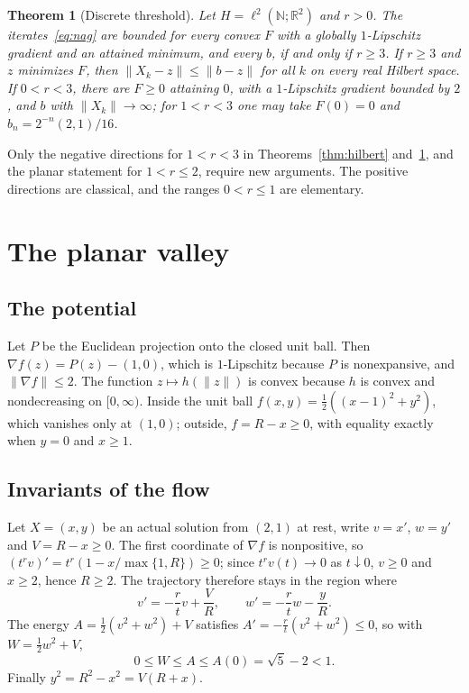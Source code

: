 \documentclass[11pt]{article}
\numberwithin{equation}{section}
\newtheorem{theorem}{Theorem}[section]
\theoremstyle{definition}
\theoremstyle{remark}
\newcommand{\R}{\mathbb R}
\newcommand{\N}{\mathbb N}
\newcommand{\norm}[1]{\lVert #1\rVert}
\begin{document}
\begin{theorem}[Discrete threshold]\label{thm:discrete}
Let $H=\ell^2(\N;\R^2)$ and $r>0$. The iterates~\eqref{eq:nag} are bounded for every convex $F$ with a globally $1$-Lipschitz gradient and an attained minimum, and every $b$, if and only if $r\ge3$. If $r\ge3$ and $z$ minimizes $F$, then $\norm{X_k-z}\le\norm{b-z}$ for all $k$ on every real Hilbert space. If $0<r<3$, there are $F\ge0$ attaining $0$, with a $1$-Lipschitz gradient bounded by $2$, and $b$ with $\norm{X_k}\to\infty$; for $1<r<3$ one may take $F(0)=0$ and $b_n=2^{-n}(2,1)/16$.
\end{theorem}

Only the negative directions for $1<r<3$ in Theorems~\ref{thm:hilbert} and~\ref{thm:discrete}, and the planar statement for $1<r\le2$, require new arguments. The positive directions are classical, and the ranges $0<r\le1$ are elementary.

\section{The planar valley}\label{sec:planar}
\subsection{The potential}
Let $P$ be the Euclidean projection onto the closed unit ball. Then $\nabla f(z)=P(z)-(1,0)$, which is $1$-Lipschitz because $P$ is nonexpansive, and $\norm{\nabla f}\le2$. The function $z\mapsto h(\norm z)$ is convex because $h$ is convex and nondecreasing on $[0,\infty)$. Inside the unit ball $f(x,y)=\frac12((x-1)^2+y^2)$, which vanishes only at $(1,0)$; outside, $f=R-x\ge0$, with equality exactly when $y=0$ and $x\ge1$.

\subsection{Invariants of the flow}
Let $X=(x,y)$ be an actual solution from $(2,1)$ at rest, write $v=x'$, $w=y'$ and $V=R-x\ge0$. The first coordinate of $\nabla f$ is nonpositive, so $(t^rv)'=t^r(1-x/\max\{1,R\})\ge0$; since $t^rv(t)\to0$ as $t\downarrow0$, $v\ge0$ and $x\ge2$, hence $R\ge2$. The trajectory therefore stays in the region where
\begin{equation}\label{eq:planar-ode}
v'=-\frac rtv+\frac VR,\qquad w'=-\frac rtw-\frac yR.
\end{equation}
The energy $A=\frac12(v^2+w^2)+V$ satisfies $A'=-\frac rt(v^2+w^2)\le0$, so with $W=\frac12w^2+V$,
\begin{equation}\label{eq:planar-energy}
0\le W\le A\le A(0)=\sqrt5-2<1.
\end{equation}
Finally $y^2=R^2-x^2=V(R+x)$.
\end{document}
